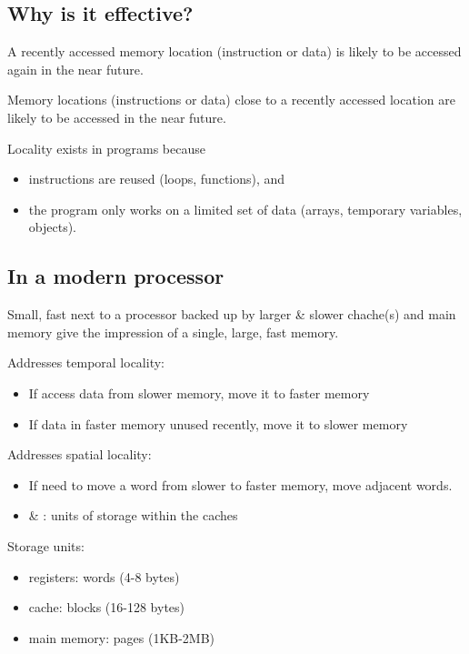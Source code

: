 \documentclass{article}
\begin{document}
\subsection{Why is it effective?}


\begin{definition}
	A recently accessed memory location (instruction or data) is likely to be accessed again in the
	near future.	
\end{definition}
\begin{definition}
	Memory locations (instructions or data) close to a recently accessed location are likely to be
	accessed in the near future.	
\end{definition}
\begin{theorem}
	Locality exists in programs because
	\begin{itemize}
		\item instructions are reused (loops, functions), and
		\item the program only works on a limited set of data (arrays, temporary variables, objects).
	\end{itemize}
\end{theorem}


\subsection{In a modern processor}


Small, fast  next to a processor backed up by larger \& slower chache(s) and main
memory give the impression of a single, large, fast memory.

Addresses temporal locality:
\begin{itemize}
	\item If access data from slower memory, move it to faster memory
	\item If data in faster memory unused recently, move it to slower memory
\end{itemize}


\noindent Addresses spatial locality:
\begin{itemize}
	\item If need to move a word from slower to faster memory, move adjacent words.
	\item {} \& : units of storage within the caches
\end{itemize}

\noindent Storage units:
\begin{itemize}
	\item registers: words (4-8 bytes)
	\item cache: blocks (16-128 bytes)
	\item main memory: pages (1KB-2MB) 
\end{itemize}
\end{document}
